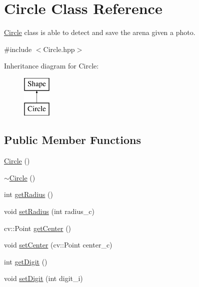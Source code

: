 \hypertarget{class_circle}{}\section{Circle Class Reference}
\label{class_circle}


\mbox{\hyperlink{class_circle}{Circle}} class is able to detect and save the arena given a photo.  




{\ttfamily \#include $<$Circle.\+hpp$>$}

Inheritance diagram for Circle\+:\begin{figure}[H]
\begin{center}
\leavevmode
\includegraphics[height=2.000000cm]{class_circle}
\end{center}
\end{figure}
\subsection*{Public Member Functions}
\begin{DoxyCompactItemize}
\item 
\mbox{\hyperlink{class_circle_ad1ecfcfc7bf34529c6a6d6c448bf70fe}{Circle}} ()
\item 
\mbox{\hyperlink{class_circle_ae3f30436e645d73e368e8ee55f8d1650}{$\sim$\+Circle}} ()
\item 
int \mbox{\hyperlink{class_circle_adfc2e5e026f5d80215563cc42260a237}{get\+Radius}} ()
\item 
void \mbox{\hyperlink{class_circle_ae4a8bd93b437b4cf0077483ff84c8626}{set\+Radius}} (int radius\+\_\+c)
\item 
cv\+::\+Point \mbox{\hyperlink{class_circle_a60d1af499a6ad295f9f2955c4409dddd}{get\+Center}} ()
\item 
void \mbox{\hyperlink{class_circle_a242599150a3623ea837fcb599214e33b}{set\+Center}} (cv\+::\+Point center\+\_\+c)
\item 
int \mbox{\hyperlink{class_circle_a50656c826a70e13fa75eb696a0dd3123}{get\+Digit}} ()
\item 
void \mbox{\hyperlink{class_circle_a187d5c4d66124603abb89f57552b6c4c}{set\+Digit}} (int digit\+\_\+i)
\end{DoxyCompactItemize}


